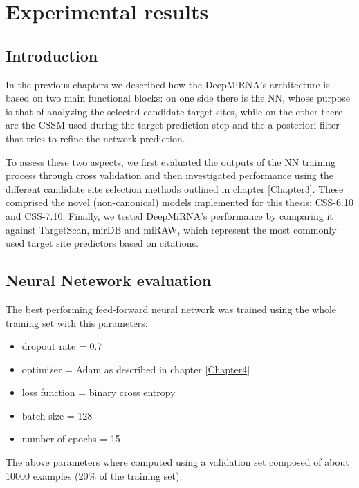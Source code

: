
\chapter{Experimental results} %

\label{Chapter5} %

\section{Introduction}
In the previous chapters we described how the DeepMiRNA's architecture is based on two main functional blocks: on one side there is the NN, whose purpose is that of analyzing the selected candidate target sites, while on the other there are the CSSM used during the target prediction step and the a-posteriori filter that tries to refine the network prediction. 

To assess these two aspects, we first evaluated the outputs of the NN training process through cross validation and then investigated performance using the different candidate site selection methods outlined in chapter \ref{Chapter3}. These comprised the novel (non-canonical) models implemented for this thesis: CSS-6.10 and CSS-7.10. Finally, we tested DeepMiRNA’s performance by comparing it against TargetScan\cite{targetscan}, mirDB\cite{mirdb} and miRAW\cite{miraw}, which represent the most commonly used target site predictors based on citations.

\section{Neural Netework evaluation}
The best performing feed-forward neural network was trained using the whole training set with this parameters:

\begin{itemize}
	\item dropout rate = 0.7
	\item optimizer = Adam as described in chapter \ref{Chapter4}
	\item loss function = binary cross entropy
	\item batch size = 128
	\item number of epochs = 15
\end{itemize}

The above parameters where computed using a validation set composed of about 10000 examples (20\% of the training set).

